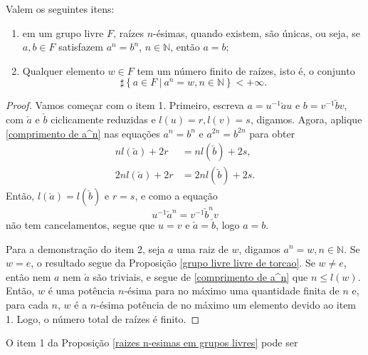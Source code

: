     	\begin{prop}
    	\label{raizes n-esimas em grupos livres}
    	    Valem os seguintes itens:
    		\begin{enumerate}
    			\item em um grupo livre $F$, raízes $n$-ésimas, quando existem, são únicas, ou seja,
    			se $a,b\in F$ satisfazem $a^n = b^n$, $n\in\mathbb{N}$, então $a = b$;
    			\item Qualquer elemento $w\in F$ tem um número finito de raízes, isto é, o conjunto 
    			\[
    			\sharp\left\{ a\in F \ \vert \ a^n = w, n\in\mathbb{N} \right\} < +\infty.
    			\]
    		\end{enumerate}
    	\end{prop}
    	\begin{proof} 
        	Vamos começar com o item 1. Primeiro, escreva $a = u^{-1}\check{a}u$ e 
        	$b = v^{-1}\check{b}v$, com $\check{a}$ e $\check{b}$ ciclicamente reduzidas e $l(u) = r, l(v) = s$,
        	digamos. Agora, aplique \eqref{comprimento de a^n} nas equações $a^n = b^n$ e $a^{2n} = b^{2n}$ para 
        	obter
    		\begin{align*}
    		    nl(\check{a}) + 2r &= nl(\check{b}) + 2s, \\
    		    2nl(\check{a}) + 2r &= 2nl(\check{b}) + 2s.
    		\end{align*}
    		Então, $l(\check{a}) = l(\check{b})$ e $r=s$, e como a equação
    		\begin{equation*}
    		    u^{-1}\check{a}^n = v^{-1}\check{b}^nv
    		\end{equation*}
    		não tem cancelamentos, segue que $u = v$ e $\check{a} = \check{b}$, logo $a=b$.
    		
    		\par\vspace{0.3cm} Para a demonstração do item 2, seja $a$ uma raiz de $w$, digamos 
    		$a^n = w, n\in\mathbb{N}$. Se $w = e$, o resultado segue da 
    		Proposição \ref{grupo livre livre de torcao}. Se $w\neq e$, então nem $a$ nem $\check{a}$ 
    		são triviais, e segue de \ref{comprimento de a^n} que $n\leq l(w)$. Então, $w$ é uma potência
    		$n$-ésima para no máximo uma quantidade finita de $n$ e, para cada $n$, $w$ é a $n$-ésima 
    		potência de no máximo um elemento devido ao item 1. Logo, o número total de raízes é finito.
    	\end{proof}
    	O item 1 da Proposição \ref{raizes n-esimas em grupos livres} pode ser 
